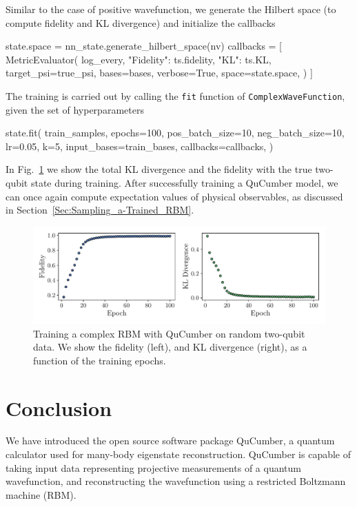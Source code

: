\documentclass[submission, Phys, hidelnks]{SciPost}
\begin{document}
Similar to the case of positive wavefunction, we generate the Hilbert space (to
compute fidelity and KL divergence) and initialize the callbacks
\begin{python}
state.space = nn_state.generate_hilbert_space(nv)
callbacks = [
  MetricEvaluator(
    log_every,
    {"Fidelity": ts.fidelity, "KL": ts.KL},
    target_psi=true_psi,
    bases=bases,
    verbose=True,
    space=state.space,
  )
]

\end{python}
The training is carried out by calling the \verb|fit| function of
\verb|ComplexWaveFunction|, given the set of hyperparameters
\begin{python}
state.fit(
    train_samples,
    epochs=100,
    pos_batch_size=10,
    neg_batch_size=10,
    lr=0.05,
    k=5,
    input_bases=train_bases,
    callbacks=callbacks,
)
\end{python}
In Fig.~\ref{fig:complex} we show the total KL divergence and the fidelity with
the true two-qubit state during training.
After successfully training a QuCumber model, we can once again compute
expectation values of physical observables,
as discussed in Section~\ref{Sec:Sampling_a-Trained_RBM}.
\begin{figure}[htb]
    \centering{}
    \includegraphics[width=\textwidth, trim={0 15 0 0}, clip]{complex_fid_KL.pdf}
    \caption{
        Training a complex RBM with QuCumber on random two-qubit data. We
        show the fidelity (left), and KL divergence (right), as a function of
        the training epochs.
    }\label{fig:complex}
\end{figure}

\section{Conclusion}

We have introduced the open source software package QuCumber, a quantum
calculator used for many-body eigenstate reconstruction. QuCumber is capable
of taking input data representing projective measurements of a quantum
wavefunction, and reconstructing the wavefunction using a restricted Boltzmann
machine (RBM).
\end{document}
